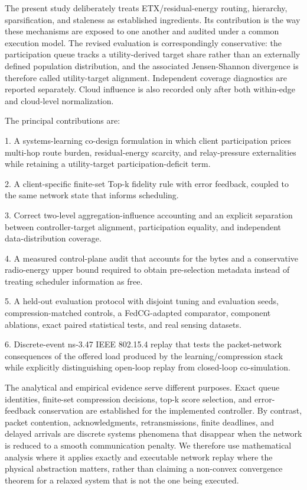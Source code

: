 \documentclass[11pt]{article}
\begin{document}
The present study deliberately treats ETX/residual-energy routing, hierarchy, sparsification, and staleness as established ingredients. Its contribution is the way these mechanisms are exposed to one another and audited under a common execution model. The revised evaluation is correspondingly conservative: the participation queue tracks a utility-derived target share rather than an externally defined population distribution, and the associated Jensen-Shannon divergence is therefore called utility-target alignment. Independent coverage diagnostics are reported separately. Cloud influence is also recorded only after both within-edge and cloud-level normalization.\par
The principal contributions are:\par
1. A systems-learning co-design formulation in which client participation prices multi-hop route burden, residual-energy scarcity, and relay-pressure externalities while retaining a utility-target participation-deficit term.\par
2. A client-specific finite-set Top-k fidelity rule with error feedback, coupled to the same network state that informs scheduling.\par
3. Correct two-level aggregation-influence accounting and an explicit separation between controller-target alignment, participation equality, and independent data-distribution coverage.\par
4. A measured control-plane audit that accounts for the bytes and a conservative radio-energy upper bound required to obtain pre-selection metadata instead of treating scheduler information as free.\par
5. A held-out evaluation protocol with disjoint tuning and evaluation seeds, compression-matched controls, a FedCG-adapted comparator, component ablations, exact paired statistical tests, and real sensing datasets.\par
6. Discrete-event ns-3.47 IEEE 802.15.4 replay that tests the packet-network consequences of the offered load produced by the learning/compression stack while explicitly distinguishing open-loop replay from closed-loop co-simulation.\par
The analytical and empirical evidence serve different purposes. Exact queue identities, finite-set compression decisions, top-k score selection, and error-feedback conservation are established for the implemented controller. By contrast, packet contention, acknowledgments, retransmissions, finite deadlines, and delayed arrivals are discrete systems phenomena that disappear when the network is reduced to a smooth communication penalty. We therefore use mathematical analysis where it applies exactly and executable network replay where the physical abstraction matters, rather than claiming a non-convex convergence theorem for a relaxed system that is not the one being executed.\par
\end{document}
